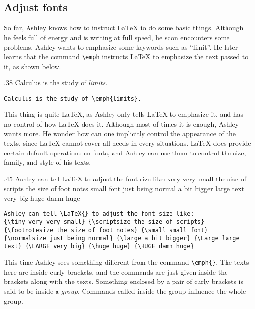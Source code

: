 \subsection{Adjust fonts}
So far, Ashley knows how to instruct \LaTeX{} to do some basic things. Although he feels full of energy and is writing at full speed, he soon encounters some problems. Ashley wants to emphasize some keywords such as ``limit''. He later learns that the command \verb=\emph= instructs \LaTeX{} to emphasize the text passed to it, as shown below.

\begin{parexammar}{.38\textandmarginlen}{
Calculus is the study of \emph{limits}.
}
\begin{lstlisting}
Calculus is the study of \emph{limits}.
\end{lstlisting}
\end{parexammar}

This thing is quite \LaTeX, as Ashley only tells \LaTeX{} to emphasize it, and has no control of how \LaTeX{} does it. Although most of times it is enough, Ashley wants more. He wonder how can one implicitly control the appearance of the texts, since \LaTeX{} cannot cover all needs in every situations. \LaTeX{} does provide certain default operations on fonts, and Ashley can use them to control the size, family, and style of his texts.

\begin{parexammar}{.45\textandmarginlen}{
Ashley can tell \LaTeX{} to adjust the font size like:
{\tiny very very small} {\scriptsize the size of scripts} {\footnotesize the size of foot notes} {\small small font} {\normalsize just being normal} {\large a bit bigger} {\Large large text} {\LARGE very big} {\huge huge} {\Huge damn huge}
}
\begin{lstlisting}
Ashley can tell \LaTeX{} to adjust the font size like:
{\tiny very very small} {\scriptsize the size of scripts} {\footnotesize the size of foot notes} {\small small font} {\normalsize just being normal} {\large a bit bigger} {\Large large text} {\LARGE very big} {\huge huge} {\HUGE damn huge}
\end{lstlisting}
\end{parexammar}
This time Ashley sees something different from the command \verb=\emph{}=. The texts here are inside curly brackets, and the commands are just given inside the brackets along with the texts. Something enclosed by a pair of curly brackets is said to be inside a \emph{group}. Commands called inside the group influence the whole group.

